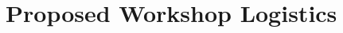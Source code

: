 \documentclass{article}
\begin{document}










    \section*{Proposed Workshop Logistics}
\end{document}
